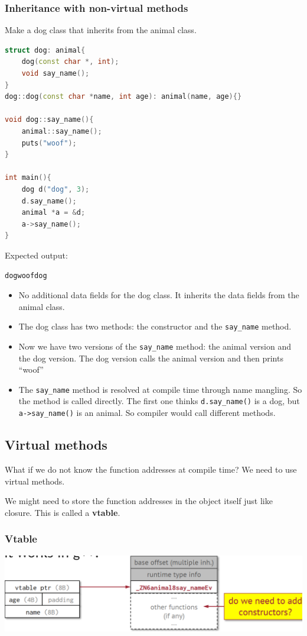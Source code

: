 \documentclass[letterpaper,12pt]{article}
\begin{document}
\subsubsection{Inheritance with non-virtual methods}
Make a dog class that inherits from the animal class.
\begin{lstlisting}[language=C++]
struct dog: animal{
    dog(const char *, int);
    void say_name();
}
dog::dog(const char *name, int age): animal(name, age){}

void dog::say_name(){
    animal::say_name();
    puts("woof");
}

int main(){
    dog d("dog", 3);
    d.say_name();
    animal *a = &d;
    a->say_name();
}
\end{lstlisting}
Expected output: \begin{lstlisting}
dogwoofdog
\end{lstlisting}
\begin{itemize}
    \item No additional data fields for the dog class. It inherits the data fields from the animal class.
    \item The dog class has two methods: the constructor and the \texttt{say\_name} method.
    \item Now we have two versions of the \texttt{say\_name} method: the animal version and the dog version. The dog version calls the animal version and then prints ``woof''
    \item The \texttt{say\_name} method is resolved at compile time through name mangling. So the method is called directly. The first one thinks \texttt{d.say\_name()} is a dog, but \texttt{a->say\_name()} is an animal. So compiler would call different methods.
\end{itemize}
\subsection{Virtual methods}
What if we do not know the function addresses at compile time? We need to use virtual methods.

We might need to store the function addresses in the object itself just like closure. This is called a \textbf{vtable}.
\subsubsection{Vtable}
\includegraphics*[scale = 0.7]{./Images/Vtable.png}
\end{document}
